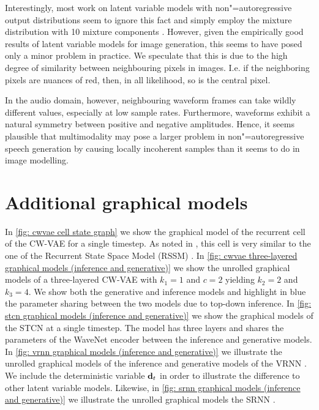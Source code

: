 {Interestingly, most work on latent variable models with non"=autoregressive output distributions seem to ignore this fact and simply employ the mixture distribution with 10 mixture components \parencite{maaloe_biva_2019, vahdat_nvae_2020, child_very_2021}.
However, given the empirically good results of latent variable models for image generation, this seems to have posed only a minor problem in practice. We speculate that this is due to the high degree of similarity between neighbouring pixels in images. I.e. if the neighboring pixels are nuances of red, then, in all likelihood, so is the central pixel.

In the audio domain, however, neighbouring waveform frames can take wildly different values, especially at low sample rates. Furthermore, waveforms exhibit a natural symmetry between positive and negative amplitudes.
Hence, it seems plausible that multimodality may pose a larger problem in non"=autoregressive speech generation by causing locally incoherent samples than it seems to do in image modelling.


\section{Additional graphical models}\label{app: additional graphical models}
In \cref{fig: cwvae cell state graph} we show the graphical model of the recurrent cell of the CW-VAE for a single timestep. As noted in \parencite{saxena_clockwork_2021}, this cell is very similar to the one of the Recurrent State Space Model (RSSM) \parencite{hafner_learning_2019}.
In \cref{fig: cwvae three-layered graphical models (inference and generative)} we show the unrolled graphical models of a three-layered CW-VAE with $k_1=1$ and $c=2$ yielding $k_2=2$ and $k_3=4$. 
We show both the generative and inference models and highlight in blue the parameter sharing between the two models due to top-down inference.
In \cref{fig: stcn graphical models (inference and generative)} we show the graphical models of the STCN \parencite{aksan_stcn_2019} at a single timestep. The model has three layers and shares the parameters of the WaveNet encoder between the inference and generative models.
In \cref{fig: vrnn graphical models (inference and generative)} we illustrate the unrolled graphical models of the inference and generative models of the VRNN \parencite{chung_recurrent_2015}. We include the deterministic variable ${\mathbf{d}}_t$ in order to illustrate the difference to other latent variable models.
Likewise, in \cref{fig: srnn graphical models (inference and generative)} we illustrate the unrolled graphical models the SRNN \parencite{fraccaro_sequential_2016}.


}
